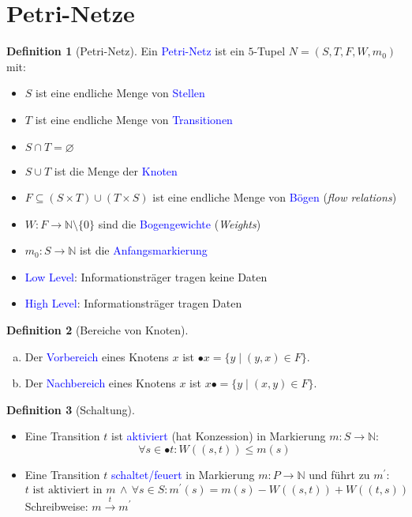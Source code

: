 \documentclass{scrreprt}
\theoremstyle{definition}
\newtheorem{Definition}{Definition}[section]
\theoremstyle{example}
\theoremstyle{algorithm}
\begin{document}
\section{Petri-Netze}
\begin{Definition}[Petri-Netz]
Ein \textcolor{blue}{Petri-Netz} ist ein $5$-Tupel $N=(S,T,F,W,m_0)$ mit:
\begin{itemize}
\item
$S$ ist eine endliche Menge von \textcolor{blue}{Stellen}
\item
$T$ ist eine endliche Menge von \textcolor{blue}{Transitionen}
\item
$S\cap T = \varnothing$
\item
$S\cup T$ ist die Menge der \textcolor{blue}{Knoten}
\item
$F \subseteq (S\times T) \cup (T \times S)$ ist eine endliche Menge von \textcolor{blue}{Bögen} (\textit{flow relations})
\item
$W: F \rightarrow \mathbb{N} \setminus \{0\}$ sind die \textcolor{blue}{Bogengewichte} (\textit{Weights}) 
\item
$m_0: S \rightarrow \mathbb{N}$ ist die \textcolor{blue}{Anfangsmarkierung}
\item
\textcolor{blue}{Low Level}: Informationsträger tragen keine Daten
\item
\textcolor{blue}{High Level}: Informationsträger tragen Daten
\end{itemize}
\end{Definition}

\begin{Definition}[Bereiche von Knoten]
\noindent
\begin{enumerate}[(a)]
\item
Der \textcolor{blue}{Vorbereich} eines Knotens $x$ ist $\bullet x = \{y \mid (y,x) \in F\}$.\item
Der \textcolor{blue}{Nachbereich} eines Knotens $x$ ist $x\bullet = \{y \mid (x,y) \in F\}$.
\end{enumerate}
\end{Definition}

\begin{Definition}[Schaltung]
\noindent
\begin{itemize}
\item
Eine Transition $t$ ist \textcolor{blue}{aktiviert} (hat Konzession) in Markierung $m : S\rightarrow\mathbb{N}$:
\begin{equation*}
\forall s \in \bullet t: W((s,t)) \leq m(s)
\end{equation*}
\item
Eine Transition $t$ \textcolor{blue}{schaltet/feuert} in Markierung $m : P\rightarrow\mathbb{N}$ und führt zu $m^\prime$:
\begin{equation*}
\text{$t$ ist aktiviert in $m$}\,\land\,\forall s \in S: m^\prime(s) = m(s) - W((s,t)) + W((t,s))
\end{equation*}
Schreibweise: $m \overset{t}{\longrightarrow} m^\prime$
\end{itemize}
\end{Definition}
\end{document}
